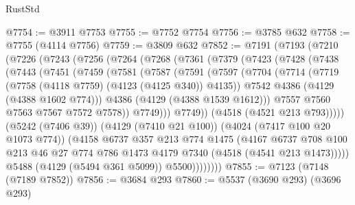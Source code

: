 \begin{lexlean}{RustStd}
\begin{coremodule}
@7754 := @3911 @7753
@7755 := @7752 @7754
@7756 := @3785 @632
@7758 := @7755 (@4114 @7756)
@7759 := @3809 @632
@7852 := @7191
    (@7193
      (@7210
        (@7226
          (@7243
            (@7256
              (@7264
                (@7268
                  (@7361
                    (@7379
                      (@7423
                        (@7428
                          (@7438
                            (@7443
                              (@7451
                                (@7459
                                  (@7581
                                    (@7587
                                      (@7591
                                        (@7597
                                          (@7704
                                            (@7714
                                              (@7719
                                                (@7758 (@4118 @7759) (@4123 (@4125 @340)) @4135))
                                              @7542
                                              @4386
                                              (@4129 (@4388 @1602 @774)))
                                            @4386
                                            (@4129 (@4388 @1539 @1612)))
                                          @7557
                                          @7560
                                          @7563
                                          @7567
                                          @7572
                                          @7578))
                                      @7749)))
                                @7749))
                            (@4518 (@4521 @213 @793)))))
                      (@5242 (@7406 @39))
                      (@4129 (@7410 @21 @100))
                      (@4024 (@7417 @100 @20 @1073 @774))
                      (@4158
                        @6737
                        @357
                        @213
                        @774
                        @1475
                        (@4167
                          @6737
                          @708
                          @100
                          @213
                          @46
                          @27
                          @774
                          @786
                          @1473
                          @4179
                          @7340
                          (@4518 (@4541 @213 @1473)))))
                    @5488
                    (@4129 (@5494 @361 @5099))
                    @5500))))))))
@7855 := @7123 (@7148 (@7189 @7852))
@7856 := @3684 @293
@7860 := @5537 (@3690 @293) (@3696 @293)

\end{coremodule}
\end{lexlean}
